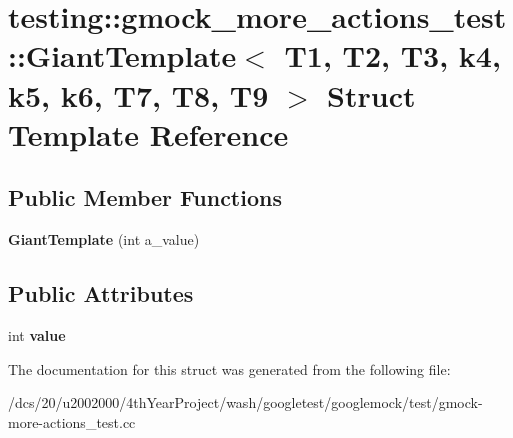 \hypertarget{structtesting_1_1gmock__more__actions__test_1_1GiantTemplate}{}\section{testing\+:\+:gmock\+\_\+more\+\_\+actions\+\_\+test\+:\+:Giant\+Template$<$ T1, T2, T3, k4, k5, k6, T7, T8, T9 $>$ Struct Template Reference}
\label{structtesting_1_1gmock__more__actions__test_1_1GiantTemplate}
\subsection*{Public Member Functions}
\begin{DoxyCompactItemize}
\item 
\mbox{\label{structtesting_1_1gmock__more__actions__test_1_1GiantTemplate_aa17b2dba62a646c1c8d76ed29ca87d92}} 
{\bfseries Giant\+Template} (int a\+\_\+value)
\end{DoxyCompactItemize}
\subsection*{Public Attributes}
\begin{DoxyCompactItemize}
\item 
\mbox{\label{structtesting_1_1gmock__more__actions__test_1_1GiantTemplate_a53212f9a801cc581ae7c6cf31ed5b21c}} 
int {\bfseries value}
\end{DoxyCompactItemize}


The documentation for this struct was generated from the following file\+:\begin{DoxyCompactItemize}
\item 
/dcs/20/u2002000/4th\+Year\+Project/wash/googletest/googlemock/test/gmock-\/more-\/actions\+\_\+test.\+cc\end{DoxyCompactItemize}
